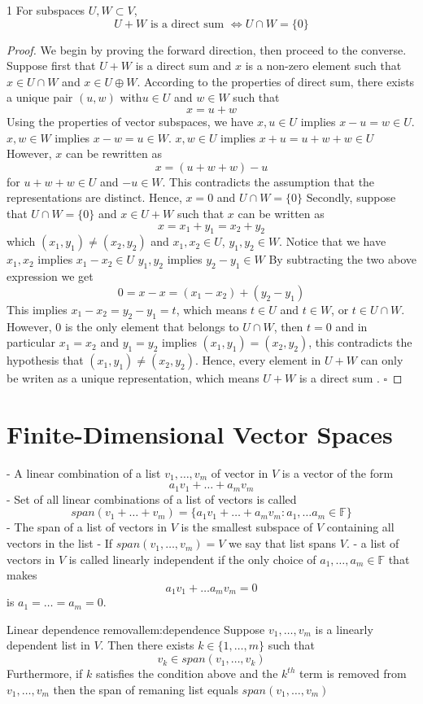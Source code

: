 \documentclass[11pt]{article}
\begin{document}
\begin{theorem}{}{1}
For subspaces $U, W \subset V$,
\[
  U + W \text{ is a direct sum } \Leftrightarrow U \cap W = \{0\}
\]
\end{theorem}
\begin{proof}
We begin by proving the forward direction, then proceed to the converse.
 Suppose first that $U + W$ is a direct sum and $x$ is a non-zero element such that $x \in U \cap W$ and $x \in U \oplus W$. 
 According to the properties of direct sum, there exists a unique pair $(u,w)$ with$u \in U$ and $w \in W$ such that
 $$
 x = u + w$$
Using the properties of vector subspaces, we have
 $x, u \in U$ implies $x - u = w \in U$.
 $x,w \in W$ implies $x - w = u \in W$. 
 $x, w\in U$ implies $x +u = u + w + w \in U$ 
 However, $x$ can be rewritten as
 $$x = (u + w +w) - u$$
 for $u + w + w \in U$ and $-u \in W$. This contradicts the assumption that the representations are distinct. Hence,  $x = 0$ and $U \cap W = \{0\}$
 Secondly, suppose that $U \cap W = \{0\}$ and $x \in U + W$ such that $x$ can be written as
 $$x = x_1+ y_1 = x_2 + y_2$$
 which $(x_1,y_1) \neq (x_2,y_2)$ and $x_1, x_2 \in U$, $y_1, y_2 \in W$.  Notice that we have
 $x_1, x_2$ implies $x_1 - x_2 \in U$ 
 $y_1, y_2$ implies $y_2 - y_1 \in W$ 
 By subtracting the two above expression we get
 $$
 0 = x - x = (x_1 - x_2) + (y_2 - y_1)
 $$
 This implies $x_1 - x_2 = y_2 - y_1 = t$, which means $t \in U$ and $t \in W$, or $t \in U \cap W$.
However, $0$ is the only element that belongs to $U \cap W$, then $t = 0$ and in particular $x_1 = x_2$ and $y_1 = y_2$ implies $(x_1,y_1) = (x_2,y_2)$, this contradicts the hypothesis that $(x_1,y_1) \neq (x_2,y_2)$. Hence, every element in $U + W$ can only be writen as a unique representation, which means $U+W$ is a direct sum . $\square$ 
\end{proof}

\section{Finite-Dimensional Vector Spaces}
- A linear combination of a list $v_1, \dots,v_m$ of vector in $V$ is a vector of the form
$$
a_1v_1 + \dots + a_mv_m
$$
- Set of all linear combinations of a list of vectors is called
	$$
		span(v_1 + \dots +v_m) = \{a_1v_1 + \dots + a_mv_m: a_1,\dots a_m \in \mathbb{F}\}
	$$
- The span of a list of vectors in $V$ is the smallest subspace of $V$ containing all vectors in the list
- If $span(v_1, \dots, v_m) = V$ we say that list spans $V$. 
- a list of vectors in $V$ is called linearly independent if the only choice of $a_1,\dots,a_m \in \mathbb{F}$ that makes
$$
a_1v_1 + \dots a_m v_m = 0
$$
    is $a_1 = \dots = a_m = 0$. 
\begin{lemma}{Linear dependence removal}{lem:dependence}
Suppose $v_1,\dots,v_m$ is a linearly dependent list in $V$. Then there exists $k \in \{1,\dots,m\}$ such that
 $$
 v_k \in span(v_1,\dots,v_k)$$
 Furthermore, if $k$ satisfies the condition above and the $k^{th}$ term is removed from $v_1,\dots,v_m$ then the span of remaning list equals $span(v_1,\dots,v_m)$  
\end{lemma}
\end{document}
